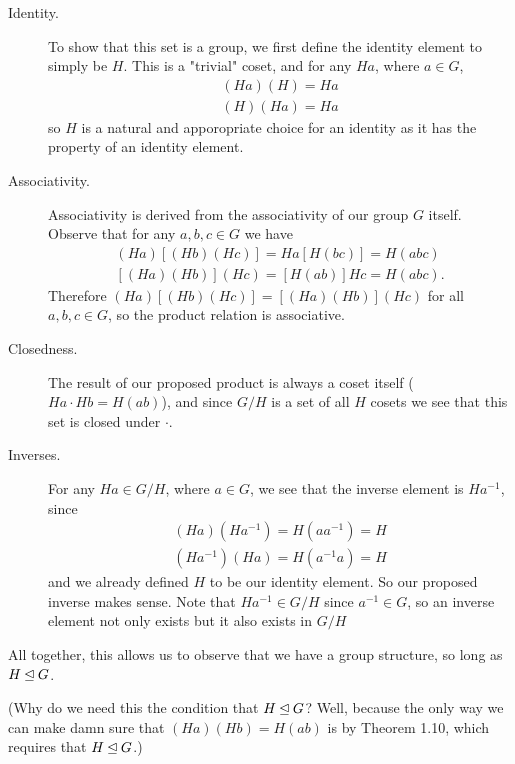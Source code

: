     \begin{prf}
        \begin{description}
            \item[Identity.] To show that this set is a group, we first define the identity
            element to simply be $H$. This is a "trivial" coset, and for
            any $Ha$, where $a \in G$, 
            \begin{align*}
                (Ha)(H) = Ha \\
                (H)(Ha) = Ha
            \end{align*}
            so $H$ is a natural and apporopriate choice for an identity as
           it has the property of an identity element.  

           \item[Associativity.] Associativity is derived from the
           associativity of our group $G$ itself. Observe that for any
           $a, b, c \in G$ we have 
           \begin{align*}
               (Ha)[ (Hb)(Hc)] = Ha[H(bc)] = H(abc)\\
               [(Ha)(Hb)](Hc) = [H(ab)]Hc = H(abc).
           \end{align*}
           Therefore $(Ha)[ (Hb)(Hc)] = [(Ha)(Hb)](Hc)$ for all $a, b,
           c \in G$, so the product relation is associative.

           \item[Closedness.] The result of our proposed product is
           always a coset itself ($Ha \cdot Hb = H(ab)$), and since 
           $G/H$ is a set of all $H$ cosets we see that this set is
           closed under $\cdot$.

           \item[Inverses.] For any $Ha \in G/H$, where $a \in G$, we
           see that the inverse element is $Ha^{-1}$, since 
           \begin{align*}
               (Ha)(Ha^{-1}) = H(aa^{-1}) = H\\
               (Ha^{-1})(Ha) = H(a^{-1}a) = H
           \end{align*}
           and we already defined $H$ to be our identity element. So
           our proposed inverse makes sense.
           Note that
           $Ha^{-1} \in G/H$ since $a^{-1} \in G$, so an inverse
           element not only exists but it also exists in $G/H$
        \end{description}
        All together, this allows us to observe that we have a group
        structure, so long as $H \unlhd G$.
    \end{prf}
    {\color{purple}(Why do we need this
        the condition that $H \unlhd G$? Well, because the only way we can make damn sure
        that $(Ha)(Hb) = H(ab)$ is by Theorem 1.10, which requires
        that $H \unlhd G$.)
        }


